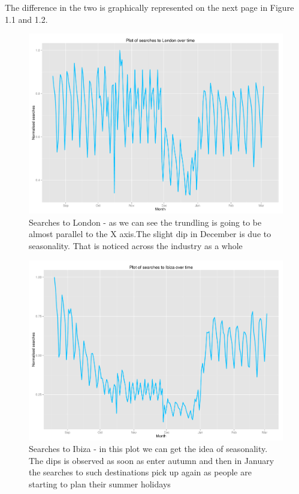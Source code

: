 \documentclass[minf,frontabs,twoside,singlespacing,parskip]{infthesis}
\begin{document}
The difference in the two is graphically represented on the next page in Figure 1.1 and 1.2. 


\begin{figure}[h!]
\begin{center}
\includegraphics[scale=0.4]{london-searches}
\end{center}
\caption{Searches to London - as we can see the trundling is going to be almost parallel to the X axis.The slight dip in December is due to seasonality. That is noticed across the industry as a whole}
\end{figure}


\begin{figure}[h!]
\begin{center}
\includegraphics[scale=0.4]{ibiza-searches}
\end{center}
\caption{Searches to Ibiza - in this plot we can get the idea of seasonality. The dips is observed as soon as enter autumn and then in January the searches to such destinations pick up again as people are starting to plan their summer holidays}
\end{figure}
\end{document}
